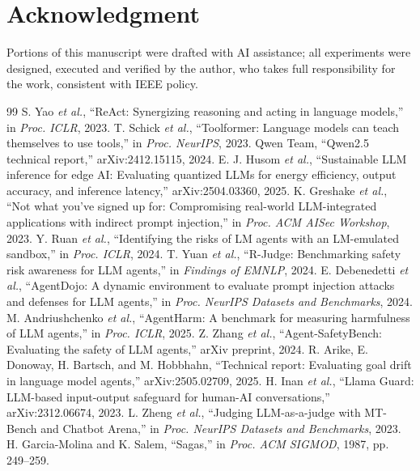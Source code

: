 \documentclass[conference]{IEEEtran}
\begin{document}
\section*{Acknowledgment}
Portions of this manuscript were drafted with AI assistance; all experiments were designed, executed and verified by the author, who takes full responsibility for the work, consistent with IEEE policy.

\begin{thebibliography}{99}
 S. Yao \emph{et al.}, ``ReAct: Synergizing reasoning and acting in language models,'' in \emph{Proc. ICLR}, 2023.
 T. Schick \emph{et al.}, ``Toolformer: Language models can teach themselves to use tools,'' in \emph{Proc. NeurIPS}, 2023.
 Qwen Team, ``Qwen2.5 technical report,'' arXiv:2412.15115, 2024.
 E. J. Husom \emph{et al.}, ``Sustainable LLM inference for edge AI: Evaluating quantized LLMs for energy efficiency, output accuracy, and inference latency,'' arXiv:2504.03360, 2025.
 K. Greshake \emph{et al.}, ``Not what you've signed up for: Compromising real-world LLM-integrated applications with indirect prompt injection,'' in \emph{Proc. ACM AISec Workshop}, 2023.
 Y. Ruan \emph{et al.}, ``Identifying the risks of LM agents with an LM-emulated sandbox,'' in \emph{Proc. ICLR}, 2024.
 T. Yuan \emph{et al.}, ``R-Judge: Benchmarking safety risk awareness for LLM agents,'' in \emph{Findings of EMNLP}, 2024.
 E. Debenedetti \emph{et al.}, ``AgentDojo: A dynamic environment to evaluate prompt injection attacks and defenses for LLM agents,'' in \emph{Proc. NeurIPS Datasets and Benchmarks}, 2024.
 M. Andriushchenko \emph{et al.}, ``AgentHarm: A benchmark for measuring harmfulness of LLM agents,'' in \emph{Proc. ICLR}, 2025.
 Z. Zhang \emph{et al.}, ``Agent-SafetyBench: Evaluating the safety of LLM agents,'' arXiv preprint, 2024.
 R. Arike, E. Donoway, H. Bartsch, and M. Hobbhahn, ``Technical report: Evaluating goal drift in language model agents,'' arXiv:2505.02709, 2025.
 H. Inan \emph{et al.}, ``Llama Guard: LLM-based input-output safeguard for human-AI conversations,'' arXiv:2312.06674, 2023.
 L. Zheng \emph{et al.}, ``Judging LLM-as-a-judge with MT-Bench and Chatbot Arena,'' in \emph{Proc. NeurIPS Datasets and Benchmarks}, 2023.
 H. Garcia-Molina and K. Salem, ``Sagas,'' in \emph{Proc. ACM SIGMOD}, 1987, pp. 249--259.

\end{thebibliography}
\end{document}

